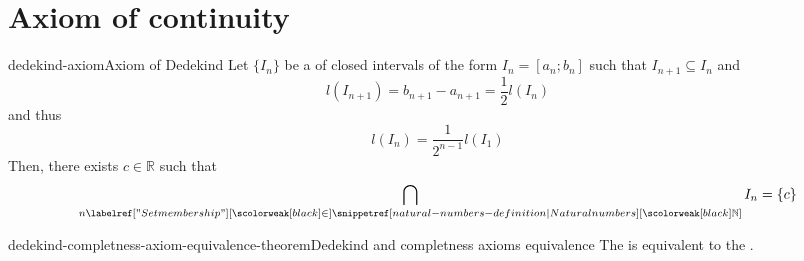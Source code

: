 \documentclass[preview]{standalone}
\begin{document}
\genpage

\section{Axiom of continuity}

\begin{snippetaxiom}{dedekind-axiom}{Axiom of Dedekind}
    Let \(\{I_n\}\) be a \sequence of closed intervals of the form
    \(I_n = [a_n; b_n]\) such that \(I_{n+1} \subseteq I_n\) and
    \[
        l(I_{n+1}) = b_{n+1}-a_{n+1} = \frac{1}{2}l(I_n)
    \]
    and thus \[l(I_n) = \frac{1}{2^{n-1}}l(I_1)\] Then, there exists \(c\in \mathbb{R}\)
    such that
    \[
        \bigcap_{n\in\naturalnumbers} I_n = \{c\}
    \]
\end{snippetaxiom}

\begin{snippettheorem}{dedekind-completness-axiom-equivalence-theorem}{Dedekind and completness axioms equivalence}
    The 
    is equivalent to the .
\end{snippettheorem}
\end{document}
